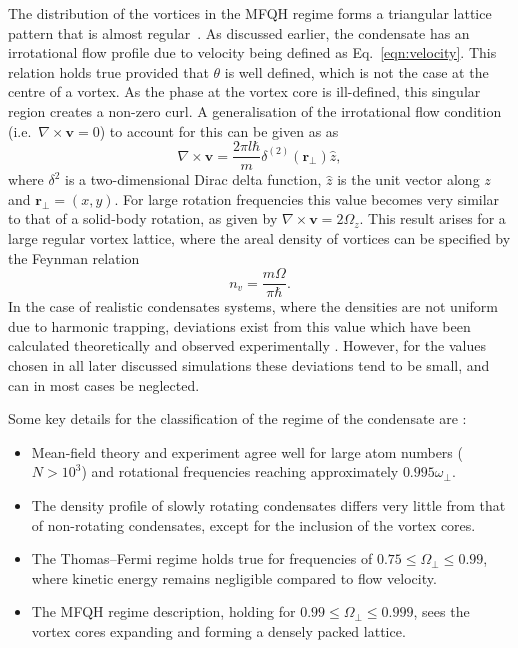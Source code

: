 The distribution of the vortices in the MFQH regime forms a triangular lattice pattern that is almost regular~\cite{Vtx:Schweikhard_prl_2004}. As discussed earlier, the condensate has an irrotational flow profile due to velocity being defined as Eq.~\eqref{eqn:velocity}. This relation holds true provided that $\theta$ is well defined, which is not the case at the centre of a vortex. As the phase at the vortex core is ill-defined, this singular region creates a non-zero curl. A generalisation of the irrotational flow condition (i.e.\ $\nabla\times \mathbf{v}=0$) to account for this can be given as as~\cite{BK:Pitaevskii_Stringari_2003,BK:Pethick_Smith_2008}
\begin{equation}
    \nabla\times \mathbf{v}=\frac{2\pi l\hbar}{m}\delta^{(2)}(\mathbf{r}_\perp) \hat{z},
\end{equation}
where $\delta^2$ is a two-dimensional Dirac delta function, $\hat{z}$ is the unit vector along $z$ and $\mathbf{r}_\perp=(x,y)$. For large rotation frequencies this value becomes very similar to that of a solid-body rotation, as given by $\nabla \times \mathbf{v}=2\Omega_z$. This result arises for a large regular vortex lattice, where the areal density of vortices can be specified by the Feynman relation~\cite{BK:Pitaevskii_Stringari_2003}
\begin{equation}\label{eqn:feynman}
n_{v} = \frac{m\Omega}{\pi\hbar}.
\end{equation}
In the case of realistic condensates systems, where the densities are not uniform due to harmonic trapping, deviations exist from this value which have been calculated theoretically \cite{PhysRevLett.93.190401, Vtx:Sheey_pra_2004_2,Vtx:Sheey_pra_2004, PhysRevA.70.033604 } and observed experimentally \cite{VTX:Coddington_pra_2004}. However, for the values chosen in all later discussed simulations these deviations tend to be small, and can in most cases be neglected.

Some key details for the classification of the regime of the condensate are \cite{BEC:Fetter_revmodphys_2009}:
\begin{itemize}
\item Mean-field theory and experiment agree well for large atom numbers ($N>10^3$) and rotational frequencies reaching approximately $0.995\omega_{\perp}$.
\item The density profile of slowly rotating condensates differs very little from that of non-rotating condensates, except for the inclusion of the vortex cores.
\item The Thomas--Fermi regime holds true for frequencies of $0.75 \leq \Omega_\perp \leq 0.99$, where kinetic energy remains negligible compared to flow velocity.
\item The MFQH regime description, holding for $0.99 \leq \Omega_\perp \leq 0.999$, sees the vortex cores expanding and forming a densely packed lattice. %
\end{itemize}

